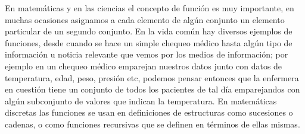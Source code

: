 







En matemáticas y en las ciencias el concepto de función es muy importante, en muchas ocasiones asignamos a cada elemento de algún conjunto un elemento particular de un segundo conjunto. En la vida común hay diversos ejemplos de funciones, desde cuando se hace un simple chequeo médico hasta algún tipo de información u noticia relevante que vemos por los medios de información; por ejemplo en un chequeo médico emparejan nuestros datos junto con datos de temperatura, edad, peso, presión etc, podemos pensar entonces que la enfermera en cuestión tiene un conjunto de todos los pacientes de tal día emparejandos con algún subconjunto de valores que indican la temperatura. En matemáticas discretas las funciones se usan en definiciones de estructuras como sucesiones o cadenas, o como funciones recursivas que se definen en términos de ellas mismas.

